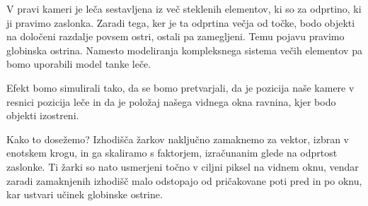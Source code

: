 \documentclass[12pt, a4paper]{article}
\begin{document}
V pravi kameri je leča sestavljena iz več steklenih elementov, ki so za odprtino, ki ji pravimo zaslonka.
Zaradi tega, ker je ta odprtina večja od točke, bodo objekti na določeni razdalje povsem ostri, ostali pa
zamegljeni. Temu pojavu pravimo globinska ostrina. Namesto modeliranja kompleksnega sistema večih elementov
pa bomo uporabili model tanke leče.


Efekt bomo simulirali tako, da se bomo pretvarjali, da je pozicija naše kamere v resnici pozicija leče in
da je položaj našega vidnega okna ravnina, kjer bodo objekti izostreni.

Kako to dosežemo? Izhodišča žarkov naključno zamaknemo za vektor, izbran v enotskem krogu, in ga skaliramo s
faktorjem, izračunanim glede na odprtost zaslonke. Ti žarki so nato usmerjeni točno v ciljni piksel na vidnem
oknu, vendar zaradi zamaknjenih izhodišč malo odstopajo od pričakovane poti pred in po oknu, kar ustvari učinek
globinske ostrine.

\printbibliography
\end{document}
